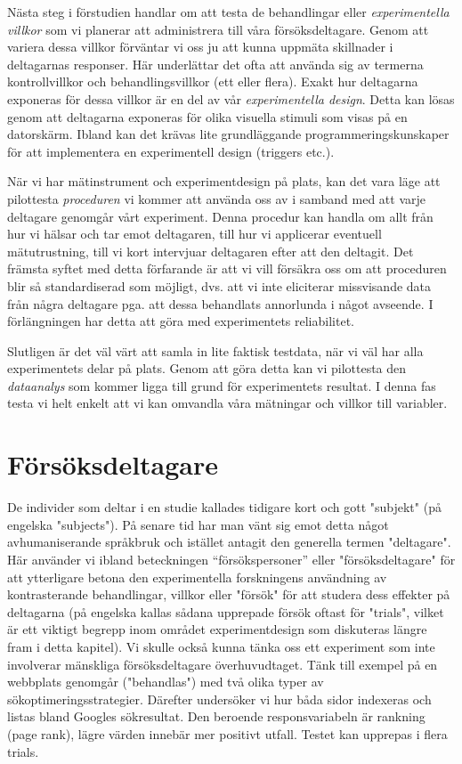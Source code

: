 \documentclass[
]{book}
\begin{document}
Nästa steg i förstudien handlar om att testa de behandlingar eller \emph{experimentella villkor} som vi planerar att administrera till våra försöksdeltagare. Genom att variera dessa villkor förväntar vi oss ju att kunna uppmäta skillnader i deltagarnas responser. Här underlättar det ofta att använda sig av termerna kontrollvillkor och behandlingsvillkor (ett eller flera). Exakt hur deltagarna exponeras för dessa villkor är en del av vår \emph{experimentella design}. Detta kan lösas genom att deltagarna exponeras för olika visuella stimuli som visas på en datorskärm. Ibland kan det krävas lite grundläggande programmeringskunskaper för att implementera en experimentell design (triggers etc.).

När vi har mätinstrument och experimentdesign på plats, kan det vara läge att pilottesta \emph{proceduren} vi kommer att använda oss av i samband med att varje deltagare genomgår vårt experiment. Denna procedur kan handla om allt från hur vi hälsar och tar emot deltagaren, till hur vi applicerar eventuell mätutrustning, till vi kort intervjuar deltagaren efter att den deltagit. Det främsta syftet med detta förfarande är att vi vill försäkra oss om att proceduren blir så standardiserad som möjligt, dvs. att vi inte eliciterar missvisande data från några deltagare pga. att dessa behandlats annorlunda i något avseende. I förlängningen har detta att göra med experimentets reliabilitet.

Slutligen är det väl värt att samla in lite faktisk testdata, när vi väl har alla experimentets delar på plats. Genom att göra detta kan vi pilottesta den \emph{dataanalys} som kommer ligga till grund för experimentets resultat. I denna fas testa vi helt enkelt att vi kan omvandla våra mätningar och villkor till variabler.

\hypertarget{sec07.2}{%
\section{Försöksdeltagare}\label{sec07.2}}

De individer som deltar i en studie kallades tidigare kort och gott "subjekt" (på engelska "subjects"). På senare tid har man vänt sig emot detta något avhumaniserande språkbruk och istället antagit den generella termen "deltagare". Här använder vi ibland beteckningen ``försökspersoner'' eller "försöksdeltagare" för att ytterligare betona den experimentella forskningens användning av kontrasterande behandlingar, villkor eller "försök" för att studera dess effekter på deltagarna (på engelska kallas sådana upprepade försök oftast för "trials", vilket är ett viktigt begrepp inom området experimentdesign som diskuteras längre fram i detta kapitel). Vi skulle också kunna tänka oss ett experiment som inte involverar mänskliga försöksdeltagare överhuvudtaget. Tänk till exempel på en webbplats genomgår ("behandlas") med två olika typer av sökoptimeringsstrategier. Därefter undersöker vi hur båda sidor indexeras och listas bland Googles sökresultat. Den beroende responsvariabeln är rankning (page rank), lägre värden innebär mer positivt utfall. Testet kan upprepas i flera trials.
\end{document}
